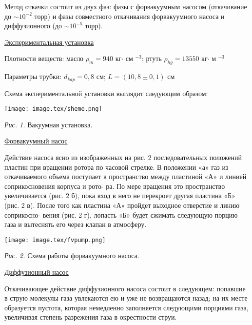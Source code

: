 \documentclass{article}
\begin{document}
Метод откачки состоит из двух фаз: фазы с форвакуумным насосом (откачивание до \(\sim 10^{-2}\) торр) и фазы совместного откачивания форвакуумного насоса и диффузионного (до \(\sim 10^{-5}\) торр).

\begin{center}
    \raggedleft
    {
        \large{\underline{Экспериментальная установка}}
    }
\end{center}

Плотности веществ: масло \(\rho_{m} = 940\) кг\(\cdot\) см \(^{-3}\); ртуть \(\rho_{hg} = 13550\) кг\(\cdot\) м \(^{-3}\)

Параметры трубки: \(d_{kap} = 0,8\) см; \(L = (10,8 \pm 0,1)\) см

Схема экспериментальной установки выглядит следующим образом:

\begin{center}
    \texttt{[image: image.tex/sheme.png]}

    \textit{Рис. 1.} Вакуумная установка.
\end{center}

\underline{Форвакуумный насос}

Действие насоса ясно из изображенных на рис. 2 последовательных положений пластин при вращении ротора по часовой стрелке. В положении «а» газ из откачиваемого объема поступает в пространство между пластиной «А» и линией соприкосновения корпуса и рото- ра. По мере вращения это пространство увеличивается (рис. 2 б), пока вход в него не перекроет другая пластина «Б» (рис. 2 в). После того как пластина «А» пройдет выходное отверстие и линию соприкосно- вения (рис. 2 г), лопасть «Б» будет сжимать следующую порцию газа и вытеснять его через клапан в атмосферу.

\begin{center}
    \texttt{[image: image.tex/fvpump.png]}

    \textit{Рис. 2.} Схема работы форвакуумного насоса.
\end{center}

\underline{Диффузионный насос}

Откачивающее действие диффузионного насоса состоит в следующем: попавшие в струю молекулы газа увлекаются ею и уже не возвращаются назад; на их месте образуется пустота, которая немедленно заполняется следующими порциями газа, увеличивая степень разрежения газа в окрестности струи.
\end{document}
